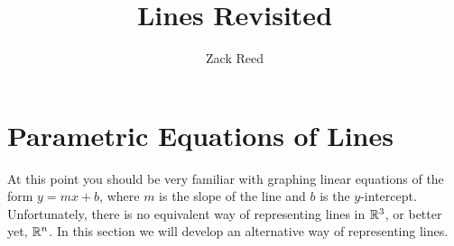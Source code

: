 \documentclass{ximera}
\author{Zack Reed}
\title{Lines Revisited}
\begin{document}
\begin{abstract}

\end{abstract}
\maketitle

\section*{Parametric Equations of Lines}
 
At this point you should be very familiar with graphing linear equations of the form $y=mx+b$, where $m$ is the slope of the line and $b$ is the $y$-intercept.  Unfortunately, there is no equivalent way of representing lines in $\mathbb{R}^3$, or better yet, $\mathbb{R}^n$.  In this section we will develop an alternative way of representing lines.
 
\end{document}
